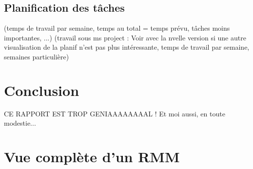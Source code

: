 \documentclass[a4paper]{article}
\begin{document}
	\subsection{Planification des tâches}
	
	(temps de travail par semaine, temps au total = temps prévu, tâches moins importantes, ...)
	(travail sous ms project : Voir avec la nvelle version si une autre visualisation de la planif n'est pas plus intéressante, temps de travail par semaine, semaines particulière)
	

\newpage
{}
{}
\section*{Conclusion}

CE RAPPORT EST TROP GENIAAAAAAAAL ! Et moi aussi, en toute modestie...

\appendix

\section{Vue compl\`ete d'un RMM}
\label{sec:annexe 1}
\end{document}
